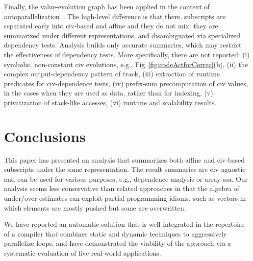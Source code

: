 \documentclass{sig-alternate}
\begin{document}
Finally, the value-evolution graph has been applied in the context of 
autoparallelization~\cite{VEG}.   The high-level difference is that there, 
subscripts are separated early into {\sc civ}-based and affine and they 
do not mix: they are summarized under different representations, 
and disambiguated via specialized dependency tests.
Analysis builds only accurate summaries, which may restrict the
effectiveness of dependency tests. 
More specifically, there are not reported:
  (i)   symbolic, non-constant {\sc civ} evolutions,
        e.g., Fig~\ref{fig:codeActforCorrec}(b),
 (ii) the complex output-dependency pattern of {\sc track},
(iii) extraction of runtime predicates for {\sc civ}-dependence tests,
 (iv) prefix-sum precomputation of {\sc civ} values, in the
        cases when they are used as data, rather than for indexing,
  (v) privatization of stack-like accesses, 
 (vi) runtime and scalability results.



\section{Conclusions}
\label{sec:Concl}

This paper has presented an analysis that summarizes both 
affine and {\sc civ}-based subscripts under the same 
representation. 
%
%
%
The result summaries are {\sc civ} agnostic and can be used for 
various  purposes, e.g., dependence analysis or array {\sc ssa}. 
%
Our analysis seems less conservative than related approaches 
in that the algebra of under/over-estimates can exploit partial 
programming idioms, such as vectors in which elements are mostly 
pushed but some are overwritten. %

We have reported an automatic solution that is well integrated 
in the repertoire of a compiler that combines static and dynamic 
techniques to aggressively parallelize loops, and have 
demonstrated the viability of the approach via a systematic
evaluation of five real-world applications.
\end{document}
